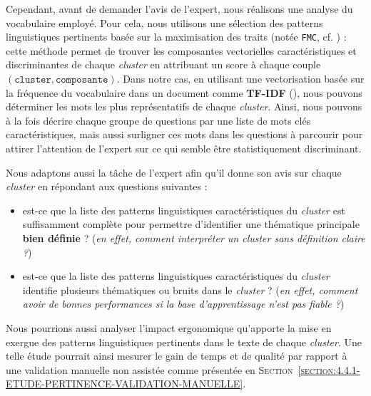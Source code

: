 			Cependant, avant de demander l'avis de l'expert, nous réalisons une analyse du vocabulaire employé.
			Pour cela, nous utilisons une sélection des patterns linguistiques pertinents basée sur la maximisation des traits (notée \texttt{FMC}, cf. \cite{lamirel-etal:2017:novel-approach-feature}) : cette méthode permet de trouver les composantes vectorielles caractéristiques et discriminantes de chaque \textit{cluster} en attribuant un score à chaque couple $(\texttt{cluster}, \texttt{composante})$.
			Dans notre cas, en utilisant une vectorisation basée sur la fréquence du vocabulaire dans un document comme \textbf{TF-IDF} (\cite{sparck-jones:1972:statistical-interpretation-term}), nous pouvons déterminer les mots les plus représentatifs de chaque \textit{cluster}.
			Ainsi, nous pouvons à la fois décrire chaque groupe de questions par une liste de mots clés caractéristiques, mais aussi surligner ces mots dans les questions à parcourir pour attirer l'attention de l'expert sur ce qui semble être statistiquement discriminant.
			
			Nous adaptons aussi la tâche de l'expert afin qu'il donne son avis sur chaque \textit{cluster} en répondant aux questions suivantes :
			\begin{itemize}
				\item est-ce que la liste des patterns linguistiques caractéristiques du \textit{cluster} est suffisamment complète pour permettre d'identifier une thématique principale \textbf{bien définie} ? (\textit{en effet, comment interpréter un cluster sans définition claire ?})
				\item est-ce que la liste des patterns linguistiques caractéristiques du \textit{cluster} identifie plusieurs thématiques ou bruits dans le \textit{cluster} ? (\textit{en effet, comment avoir de bonnes performances si la base d'apprentissage n'est pas fiable ?})
			\end{itemize}
			
			\begin{leftBarIdea}
				Nous pourrions aussi analyser l'impact ergonomique qu'apporte la mise en exergue des patterns linguistiques pertinents dans le texte de chaque \textit{cluster}.
				Une telle étude pourrait ainsi mesurer le gain de temps et de qualité par rapport à une validation manuelle non assistée comme présentée en \textsc{Section~\ref{section:4.4.1-ETUDE-PERTINENCE-VALIDATION-MANUELLE}}.
			\end{leftBarIdea}
			
